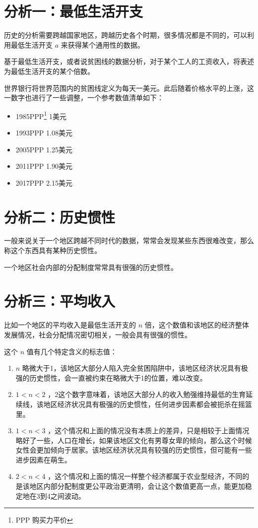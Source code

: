 \documentclass[12pt,oneside]{book}
\begin{document}
\section{分析一：最低生活开支}
历史的分析需要跨越国家地区，跨越历史各个时期，很多情况都是不同的，可以利用最低生活开支 $ a $ 来获得某个通用性的数据。

基于最低生活开支，或者说贫困线的数据分析，对于某个工人的工资收入，将表述为最低生活开支的某个倍数。

世界银行将世界范围内的贫困线定义为每天一美元。此后随着价格水平的上涨，这一数字也进行了一些调整，一个参考数值清单如下：

\begin{itemize}
\item 1985PPP\footnote{PPP 购买力平价} 1美元
\item 1993PPP 1.08美元
\item 2005PPP 1.25美元
\item 2011PPP 1.90美元
\item 2017PPP 2.15美元
\end{itemize}


\section{分析二：历史惯性}
一般来说关于一个地区跨越不同时代的数据，常常会发现某些东西很难改变，那么称这个东西具有某种历史惯性。

一个地区社会内部的分配制度常常具有很强的历史惯性。


\section{分析三：平均收入}
比如一个地区的平均收入是最低生活开支的 $ n $ 倍，这个数值和该地区的经济整体发展情况，社会分配情况密切相关，一般会具有很强的惯性。

这个 $ n $ 值有几个特定含义的标志值：

\begin{enumerate}
\item $ n $ 略微大于1，该地区大部分人陷入完全贫困陷阱中，该地区经济状况具有极强的历史惯性，会一直被约束在略微大于1的位置，难以改变。
\item $ 1< n < 2 $ ，2这个数字意味着，该地区大部分人的收入勉强维持最低的生育延续线，该地区经济状况具有极强的历史惯性，任何进步因素都会被扼杀在摇篮里。
\item $ 1< n < 3 $ ，这个情况和上面的情况没有本质上的差异，只是相较于上面情况略好了一些，人口在增长，如果该地区文化有男尊女卑的倾向，那么这个时候女性会更加倾向于居家。该地区经济状况具有较强的历史惯性，但可能有一些进步因素在萌生。
\item $ 2 <n < 4$ ，这个情况和上面的情况一样整个经济都属于农业型经济，不同的是该地区内部分配制度更公平政治更清明，会让这个数值更高一点，能更加稳定地在3到4之间波动。
\end{enumerate}
\end{document}
